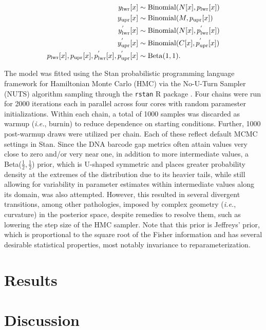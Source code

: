 \documentclass[12pt]{article}
\begin{document}
\begin{align}
\notag y_\mathrm{lwr}[x] &\sim \mathrm{Binomial}(N[x], p_\mathrm{lwr}[x]) \\ 
\notag y_\mathrm{upr}[x] &\sim \mathrm{Binomial}(M, p_\mathrm{upr}[x]) \\ 
y^{'}_\mathrm{lwr}[x] &\sim \mathrm{Binomial}(N[x], p^{'}_\mathrm{lwr}[x]) \\ 
 \notag y^{'}_\mathrm{upr}[x] &\sim \mathrm{Binomial}(C[x], p^{'}_\mathrm{upr}[x]) \\ 
\notag p_\mathrm{lwr}[x], p_\mathrm{upr}[x], p^{'}_\mathrm{lwr}[x], p^{'}_\mathrm{upr}[x]
&\sim \mathrm{Beta}(1, 1).
\end{align}

The model was fitted using the Stan probabilistic programming language  \citep{carpenter2017stan} framework for Hamiltonian Monte Carlo (HMC) via the No-U-Turn Sampler (NUTS) algorithm \citep{hoffman2014no} sampling through the {\tt rstan} R package \citep{stan2023rstan}. Four chains were run for 2000 iterations each in parallel across four cores with random paramester initializations. Within each chain, a total of 1000 samples was discarded as warmup (\textit{i.e.}, burnin) to reduce dependence on starting conditions. Further, 1000 post-warmup draws were utilized per chain. Each of these reflect default MCMC settings in Stan. Since the DNA barcode gap metrics often attain values very close to zero and/or very near one, in addition to more intermediate values, a Beta($\frac{1}{2}, \frac{1}{2}$) prior, which is U-shaped symmetric and places greater probability density at the extremes of the distribution due to its heavier tails, while still allowing for variability in parameter estimates within intermediate values along its domain, was also attempted. However, this resulted in several divergent transitions, among other pathologies, imposed by complex geometry (\textit{i.e.}, curvature) in the posterior space, despite remedies to resolve them, such as lowering the step size of the HMC sampler. Note that this prior is Jeffreys' prior, which is proportional to the square root of the Fisher information and has several desirable statistical properties, most notably invariance to reparameterization.



\section{Results}

\section{Discussion}
\end{document}
